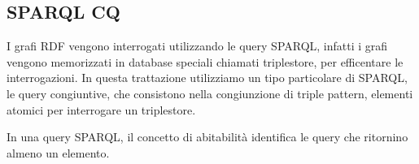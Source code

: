 
\subsection{SPARQL CQ}
I grafi RDF vengono interrogati utilizzando le query SPARQL, infatti i grafi vengono memorizzati in database speciali chiamati triplestore, per efficentare le interrogazioni. In questa trattazione utilizziamo un tipo particolare di SPARQL, le query congiuntive, che consistono nella congiunzione di triple pattern, elementi atomici per interrogare un triplestore.
\begin{definition}[Abitabilità]
	In una query SPARQL, il concetto di abitabilità identifica le query che ritornino almeno un elemento.
\end{definition}

